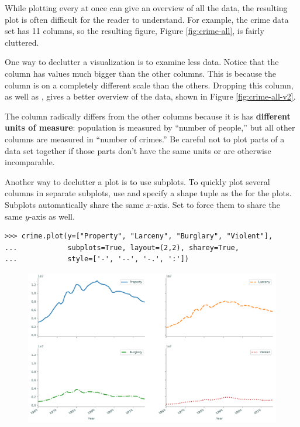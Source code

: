 While plotting every  at once can give an overview of all the data, the resulting plot is often difficult for the reader to understand.
For example, the crime data set has 11 columns, so the resulting figure, Figure \ref{fig:crime-all}, is fairly cluttered.

One way to declutter a visualization is to examine less data.
Notice that the  column has values much bigger than the other columns.
This is because the  column is on a completely different scale than the others.
Dropping this column, as well as , gives a better overview of the data, shown in Figure \ref{fig:crime-all-v2}.

\begin{warn}
The  column radically differs from the other columns because it is has \textbf{different units of measure}: population is measured by ``number of people,'' but all other columns are measured in ``number of crimes.''
Be careful not to plot parts of a data set together if those parts don't have the same units or are otherwise incomparable.
\end{warn}

Another way to declutter a plot is to use subplots.
To quickly plot several columns in separate subplots, use  and specify a shape tuple as the  for the plots.
Subplots automatically share the same $x$-axis.
Set  to force them to share the same $y$-axis as well.

\begin{lstlisting}
>>> crime.plot(y=["Property", "Larceny", "Burglary", "Violent"],
...            subplots=True, layout=(2,2), sharey=True,
...            style=['-', '--', '-.', ':'])
\end{lstlisting}

\begin{figure}[H]
    \includegraphics[width=.7\textwidth]{figures/line_subplots.pdf}
\end{figure}

